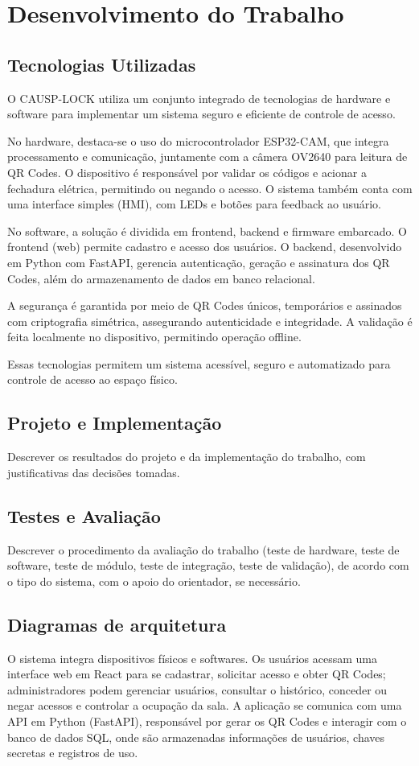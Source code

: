 \chapter{Desenvolvimento do Trabalho} \label{cap:desenvolvimento}

\section{Tecnologias Utilizadas}
O CAUSP-LOCK utiliza um conjunto integrado de tecnologias de hardware e software para implementar um sistema seguro e eficiente de controle de acesso.

No hardware, destaca-se o uso do microcontrolador ESP32-CAM, que integra processamento e comunicação, juntamente com a câmera OV2640 para leitura de QR Codes. O dispositivo é responsável por validar os códigos e acionar a fechadura elétrica, permitindo ou negando o acesso. O sistema também conta com uma interface simples (HMI), com LEDs e botões para feedback ao usuário.

No software, a solução é dividida em frontend, backend e firmware embarcado. O frontend (web) permite cadastro e acesso dos usuários. O backend, desenvolvido em Python com FastAPI, gerencia autenticação, geração e assinatura dos QR Codes, além do armazenamento de dados em banco relacional.

A segurança é garantida por meio de QR Codes únicos, temporários e assinados com criptografia simétrica, assegurando autenticidade e integridade. A validação é feita localmente no dispositivo, permitindo operação offline.

Essas tecnologias permitem um sistema acessível, seguro e automatizado para controle de acesso ao espaço físico.


\section{Projeto e Implementação}
Descrever os resultados do projeto e da implementação do trabalho, com justificativas das decisões tomadas.

\section{Testes e Avaliação}
Descrever o procedimento da avaliação do trabalho (teste de hardware, teste de software, teste de módulo, teste de integração, teste de validação), de acordo com o tipo do sistema, com o apoio do orientador, se necessário.
\section{Diagramas de arquitetura}
O sistema integra dispositivos físicos e softwares. Os usuários acessam uma interface web em React para se cadastrar, solicitar acesso e obter QR Codes; administradores podem gerenciar usuários, consultar o histórico, conceder ou negar acessos e controlar a ocupação da sala. A aplicação se comunica com uma API em Python (FastAPI), responsável por gerar os QR Codes e interagir com o banco de dados SQL, onde são armazenadas informações de usuários, chaves secretas e registros de uso.


